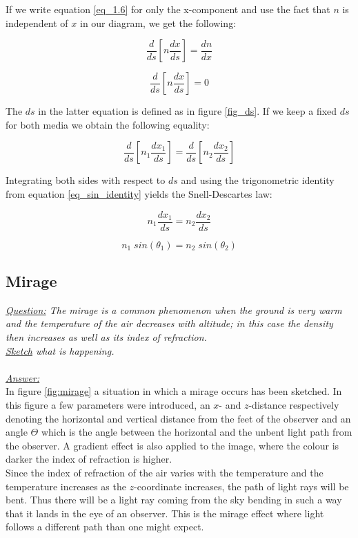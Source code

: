 \documentclass{article}
\begin{document}
If we write equation \ref{eq_1.6} for only the x-component and use the fact that $n$ is independent of $x$ in our diagram, we get the following:

\begin{equation*}
	\frac{d}{ds} \left[ n \frac{d x}{ds} \right] = \frac{d n}{dx}
\end{equation*}

\begin{equation*}
	\frac{d}{ds} \left[ n \frac{d x}{ds} \right] = 0
\end{equation*}

The $ds$ in the latter equation is defined as in figure \ref{fig_ds}. If we keep a fixed $ds$ for both media we obtain the following equality:

\begin{equation*}
	\frac{d}{ds} \left[ n_1 \frac{d x_1}{ds} \right] = \frac{d}{ds} \left[ n_2 \frac{d x_2}{ds} \right]
\end{equation*}

Integrating both sides with respect to $ds$ and using the trigonometric identity from equation \ref{eq_sin_identity} yields the Snell-Descartes law:

\begin{equation*}
	n_1 \frac{d x_1}{ds}=n_2 \frac{d x_2}{ds}
\end{equation*}

\begin{equation}
	n_1 \; sin(\theta _1) = n_2 \; sin(\theta _2)
	\label{eq_snell}
\end{equation}

\newpage
\subsection{Mirage}

\textit{\underline{Question:} The mirage is a common phenomenon when the ground is very warm and the temperature of the air decreases with altitude; in this case the density then increases as well as its index of refraction.\\
\underline{Sketch} what is happening.}\\
\\
\textit{\underline{Answer:}} \\
In figure \ref{fig:mirage} a situation in which a mirage occurs has been sketched. In this figure a few parameters were introduced, an $x$- and $z$-distance respectively denoting the horizontal and vertical distance from the feet of the observer and an angle $\Theta$ which is the angle between the horizontal and the unbent light path from the observer. A gradient effect is also applied to the image, where the colour is darker the index of refraction is higher.\\
Since the index of refraction of the air varies with the temperature and the temperature increases as the $z$-coordinate increases, the path of light rays will be bent. Thus there will be a light ray coming from the sky bending in such a way that it lands in the eye of an observer. This is the mirage effect where light follows a different path than one might expect.\\
\end{document}
